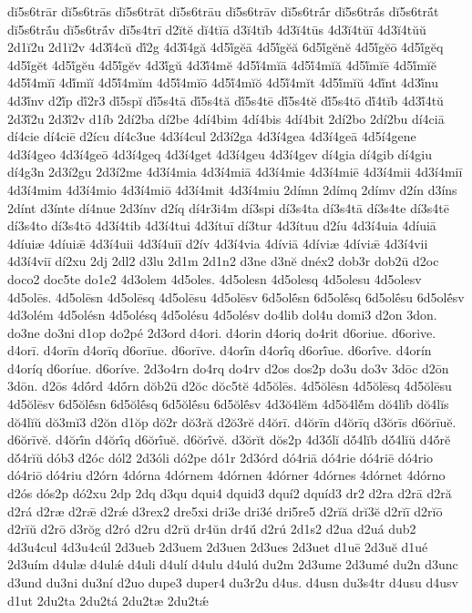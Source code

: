 {dĭ5s6trār
dĭ5s6trās
dĭ5s6trāt
dĭ5s6trāu
dĭ5s6trāv
dĭ5s6trā́r
dĭ5s6trā́s
dĭ5s6trā́t
dĭ5s6trā́u
dĭ5s6trā́v
dĭ5s4trī
d2ĭtĕ
dĭ4tĭā
d3ĭ4tĭb
4d3ĭ4tūs
4d3ĭ4tŭī
4d3ĭ4tŭŭ
2d1ĭ2u
2d1ĭ2v
4d3ĭ́4cŭ
dĭ́2g
4d3ĭ́4gă
4d5ĭ́gĕā
4d5ĭ́gĕă
6d5ĭ́gĕnĕ
4d5ĭ́gĕō
4d5ĭ́gĕq
4d5ĭ́gĕt
4d5ĭ́gĕu
4d5ĭ́gĕv
4d3ĭ́gŭ
4d3ĭ́4mĕ
4d5ĭ́4mĭā
4d5ĭ́4mĭă
4d5ĭ́mĭē
4d5ĭ́mĭĕ
4d5ĭ́4mĭī
4dĭ́mĭĭ
4d5ĭ́4mĭm
4d5ĭ́4mĭō
4d5ĭ́4mĭŏ
4d5ĭ́4mĭt
4d5ĭ́mĭŭ
4dĭ́nt
4d3ĭ́nu
4d3ĭ́nv
d2ĭ́p
dĭ́2r3
dĭ́5spĭ
dĭ́5s4tā
dĭ́5s4tă
dĭ́5s4tē
dĭ́5s4tĕ
dĭ́5s4tō
dĭ́4tĭb
4d3ĭ́4tŭ
2d3ĭ́2u
2d3ĭ́2v
d1íb
2dí2ba
dí2be
4dí4bim
4dí4bis
4dí4bit
2dí2bo
2dí2bu
dí4ciā
dí4cie
dí4ciē
d2ícu
dí4c3ue
4d3í4cul
2d3í2ga
4d3í4gea
4d3í4geā
4d5í4gene
4d3í4geo
4d3í4geō
4d3í4geq
4d3í4get
4d3í4geu
4d3í4gev
dí4gia
dí4gib
dí4giu
dí4g3n
2d3í2gu
2d3í2me
4d3í4mia
4d3í4miā
4d3í4mie
4d3í4miē
4d3í4mii
4d3í4miī
4d3í4mim
4d3í4mio
4d3í4miō
4d3í4mit
4d3í4miu
2dímn
2dímq
2dímv
d2ín
d3íns
2dínt
d3ínte
dí4nue
2d3ínv
d2íq
dí4r3i4m
dí3spi
dí3s4ta
dí3s4tā
dí3s4te
dí3s4tē
dí3s4to
dí3s4tō
4d3í4tib
4d3í4tui
4d3ítuī
dí3tur
4d3ítuu
d2íu
4d3í4uia
4díuiā
4díuiæ
4díuiǣ
4d3í4uii
4d3í4uiī
d2ív
4d3í4via
4díviā
4díviæ
4díviǣ
4d3í4vii
4d3í4viī
dí2xu
2dj
2dl2
d3lu
2d1m
2d1n2
d3ne
d3nĕ
dnéx2
dob3r
dob2ū
d2oc
doco2
doc5te
do1e2
4d3olem
4d5oles.
4d5olesn
4d5olesq
4d5olesu
4d5olesv
4d5olēs.
4d5olēsn
4d5olēsq
4d5olēsu
4d5olēsv
6d5olḗsn
6d5olḗsq
6d5olḗsu
6d5olḗsv
4d3olém
4d5olésn
4d5olésq
4d5olésu
4d5olésv
do4lib
dol4u
domi3
d2on
3don.
do3ne
do3ni
d1op
do2pé
2d3ord
d4ori.
d4orin
d4oriq
do4rit
d6oriue.
d6orive.
d4orī.
d4orīn
d4orīq
d6orīue.
d6orīve.
d4orī́n
d4orī́q
d6orī́ue.
d6orī́ve.
d4orín
d4oríq
d6oríue.
d6oríve.
2d3o4rn
do4rq
do4rv
d2os
dos2p
do3u
do3v
3dōc
d2ōn
3dōn.
d2ōs
4dṓrd
4dṓrn
dŏb2ū
d2ŏc
dŏc5tĕ
4d5ŏlēs.
4d5ŏlēsn
4d5ŏlēsq
4d5ŏlēsu
4d5ŏlēsv
6d5ŏlḗsn
6d5ŏlḗsq
6d5ŏlḗsu
6d5ŏlḗsv
4d3ŏ4lĕm
4d5ŏ4lĕ́m
dŏ4lĭb
dŏ4lĭs
dŏ4lĭŭ
dŏ3mĭ3
d2ŏn
d1ŏp
dŏ2r
dŏ3ră
d2ŏ3rĕ
d4ŏrī.
d4ŏrīn
d4ŏrīq
d3ŏrīs
d6ŏrīuĕ.
d6ŏrīvĕ.
d4ŏrī́n
d4ŏrī́q
d6ŏrī́uĕ.
d6ŏrī́vĕ.
d3ŏrĭt
dŏs2p
4d3ŏ́lĭ
dŏ́4lĭb
dŏ́4lĭŭ
d4ŏ́rĕ
dŏ́4rĭŭ
dób3
d2óc
dól2
2d3óli
dó2pe
dó1r
2d3órd
dó4riā
dó4rie
dó4riē
dó4rio
dó4riō
dó4riu
d2órn
4dórna
4dórnem
4dórnen
4dórner
4dórnes
4dórnet
4dórno
d2ós
dós2p
dó2xu
2dp
2dq
d3qu
dqui4
dquid3
dquí2
dquíd3
dr2
d2ra
d2rā
d2ră
d2rá
d2ræ
d2rǣ
d2rǽ
d3rex2
dre5xi
dri3e
dri3é
dri5re5
d2rĭă
drĭ3ĕ
d2rĭī
d2rĭō
d2rĭŭ
d2rō
d3rŏg
d2ró
d2ru
d2rŭ
dr4ŭn
dr4ŭ́
d2rú
2d1s2
d2ua
d2uá
dub2
4d3u4cul
4d3u4cúl
2d3ueb
2d3uem
2d3uen
2d3ues
2d3uet
d1uē
2d3uĕ
d1ué
2d3uím
d4ulæ
d4ulǽ
d4uli
d4ulí
d4ulu
d4ulú
du2m
2d3ume
2d3umé
du2n
d3unc
d3und
du3ni
du3ní
d2uo
dupe3
duper4
du3r2u
d4us.
d4usn
du3s4tr
d4usu
d4usv
d1ut
2du2ta
2du2tá
2du2tæ
2du2tǽ
}
